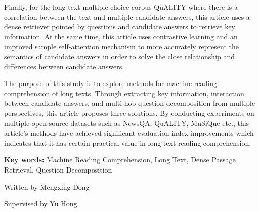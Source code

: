 \begin{eabstract}
	Finally, for the long-text multiple-choice corpus QuALITY where there is a correlation between the text and multiple candidate answers, this article uses a dense retriever pointed by questions and candidate answers to retrieve key information. At the same time, this article uses contrastive learning and an improved sample self-attention mechanism to more accurately represent the semantics of candidate answers in order to solve the close relationship and differences between candidate answers.
	
	The purpose of this study is to explore methods for machine reading comprehension of long texts. Through extracting key information, interaction between candidate answers, and multi-hop question decomposition from multiple perspectives, this article proposes three solutions. By conducting experiments on multiple open-source datasets such as NewsQA, QuALITY, MuSiQue etc., this article's methods have achieved significant evaluation index improvements which indicates that it has certain practical value in long-text reading comprehension.

	\vskip 21bp
	{\bf{} Key words: }
	Machine Reading Comprehension,
	Long Text,
	Dense Passage Retrieval,
	Question Decomposition
\end{eabstract}

\begin{flushright}
	Written by Mengxing Dong
	
	Supervised by Yu Hong
\end{flushright}


